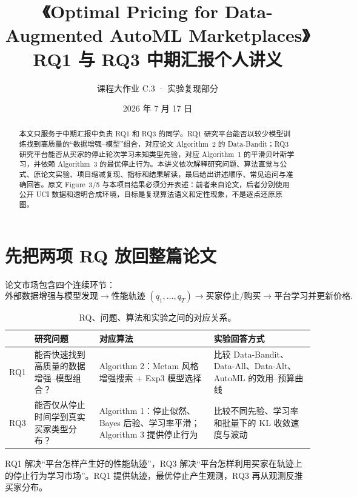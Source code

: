 \documentclass[11pt,a4paper]{ctexart}
\title{《Optimal Pricing for Data-Augmented AutoML Marketplaces》\\\large RQ1 与 RQ3 中期汇报个人讲义}
\author{课程大作业 C.3 · 实验复现部分}
\date{2026 年 7 月 17 日}
\begin{document}
\maketitle
\begin{abstract}
本文只服务于中期汇报中负责 RQ1 和 RQ3 的同学。RQ1 研究平台能否以较少模型训练找到高质量的“数据增强--模型”组合，对应论文 Algorithm~2 的 Data-Bandit；RQ3 研究平台能否从买家的停止轮次学习未知类型先验，对应 Algorithm~1 的平滑贝叶斯学习，并依赖 Algorithm~3 的最优停止行为。本讲义依次解释研究问题、算法直觉与公式、原论文实验、项目缩减复现、指标和结果解读，最后给出讲述顺序、常见追问与准确回答。原文 Figure~3/5 与本项目结果必须分开表述：前者来自论文，后者分别使用公开 UCI 数据和透明合成环境，目标是复现算法语义和定性现象，不是逐点还原原图。
\end{abstract}
\tableofcontents
\newpage

\section{先把两项 RQ 放回整篇论文}
论文市场包含四个连续环节：
\[
\text{外部数据增强与模型发现}
\longrightarrow \text{性能轨迹 }(q_1,\ldots,q_T)
\longrightarrow \text{买家停止/购买}
\longrightarrow \text{平台学习并更新价格}.
\]

\begin{table}[H]
\centering
\caption{RQ、问题、算法和实验之间的对应关系。}
\begin{tabularx}{\textwidth}{>{\bfseries\raggedright\arraybackslash}p{}>{\raggedright\arraybackslash}p{}>{\raggedright\arraybackslash}p{}>{\raggedright\arraybackslash}X}
\toprule
& 研究问题 & 对应算法 & 实验回答方式\\
\midrule
RQ1 & 能否快速找到高质量的数据增强--模型组合？ & Algorithm 2：Metam 风格增强搜索 + Exp3 模型选择 & 比较 Data-Bandit、Data-All、Data-Alt、AutoML 的效用--预算曲线\\
RQ3 & 能否仅从停止时间学到真实买家类型分布？ & Algorithm 1：停止似然、Bayes 后验、学习率平滑；Algorithm 3 提供停止行为 & 比较不同先验、学习率和批量下的 KL 收敛速度与波动\\
\bottomrule
\end{tabularx}
\end{table}

\begin{takeaway}
RQ1 解决“平台怎样产生好的性能轨迹”，RQ3 解决“平台怎样利用买家在轨迹上的停止行为学习市场”。RQ1 提供轨迹，最优停止产生观测，RQ3 再从观测反推买家分布。
\end{takeaway}
\end{document}
